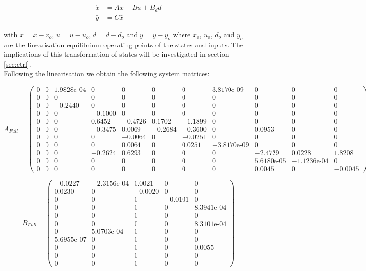 \begin{equation} \label{eq:state_space_linear}
	\begin{split}
		\dot{x} & = A\bar{x} + B\bar{u} + B_d\bar{d} \\
		\bar{y} & = C\bar{x}
	\end{split}
\end{equation}

with $\bar{x} = x-x_o$, $\bar{u} = u-u_o$, $\bar{d} = d-d_o$ and $\bar{y} = y-y_o$ where $x_o$, $u_o$, $d_o$ and $y_o$ are the linearisation equilibrium operating points of the states and inputs. The implications of this transformation of states will be investigated in section \cref{sec:ctrl}.\\

Following the linearisation we obtain the following system matrices:

\begin{equation}  \label{eq:A_full}
	A_{Full} =
	\left(\begin{array}{ccccccccccc}
		0 & 0 & \text{1.9828e-04} & 0 & 0 & 0 & 0 & \text{3.8170e-09} & 0 & 0 & 0\\
		0 & 0 & 0 & 0 & 0 & 0 & 0 & 0 & 0 & 0 & 0\\
		0 & 0 & -0.2440 & 0 & 0 & 0 & 0 & 0 & 0 & 0 & 0\\
		0 & 0 & 0 & -0.1000 & 0 & 0 & 0 & 0 & 0 & 0 & 0\\
		0 & 0 & 0 & 0.6452 & -0.4726 & 0.1702 & -1.1899 & 0 & 0 & 0 & 0\\
		0 & 0 & 0 & -0.3475 & 0.0069 & -0.2684 & -0.3600 & 0 & 0.0953 & 0 & 0\\
		0 & 0 & 0 & 0 & -0.0064 & 0 & -0.0251 & 0 & 0 & 0 & 0\\
		0 & 0 & 0 & 0 & 0.0064 & 0 & 0.0251 & -\text{3.8170e-09} & 0 & 0 & 0\\
		0 & 0 & 0 & -0.2624 & 0.6293 & 0 & 0 & 0 & -2.4729 & 0.0228 & 1.8208\\
		0 & 0 & 0 & 0 & 0 & 0 & 0 & 0 & \text{5.6180e-05} & -\text{1.1236e-04} & 0\\
		0 & 0 & 0 & 0 & 0 & 0 & 0 & 0 & 0.0045 & 0 & -0.0045
	\end{array}\right)
\end{equation}

\begin{equation}  \label{eq:B_full}
	B_{Full} = \left(\begin{array}{ccccc}
		-0.0227 & -\text{2.3156e-04} & 0.0021 & 0 & 0\\
		0.0230 & 0 & -0.0020 & 0 & 0\\
		0 & 0 & 0 & -0.0101 & 0\\
		0 & 0 & 0 & 0 & \text{8.3941e-04}\\
		0 & 0 & 0 & 0 & 0\\
		0 & 0 & 0 & 0 & \text{8.3101e-04}\\
		0 & \text{5.0703e-04} & 0 & 0 & 0\\
		\text{5.6955e-07} & 0 & 0 & 0 & 0\\
		0 & 0 & 0 & 0 & 0.0055\\
		0 & 0 & 0 & 0 & 0\\
		0 & 0 & 0 & 0 & 0
	\end{array}\right)
\end{equation}

